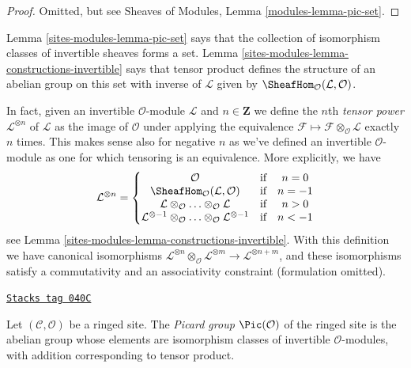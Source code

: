 \begin{proof}
Omitted, but see Sheaves of Modules, Lemma \ref{modules-lemma-pic-set}.
\end{proof}

Lemma \ref{sites-modules-lemma-pic-set} says that the collection of
isomorphism classes of invertible sheaves forms a set.
Lemma \ref{sites-modules-lemma-constructions-invertible} says that
tensor product defines the structure of an abelian group
on this set with inverse of $\mathcal{L}$ given by
$\SheafHom_\mathcal{O}(\mathcal{L}, \mathcal{O})$.

\medskip\noindent
In fact, given an invertible $\mathcal{O}$-module
$\mathcal{L}$ and $n \in \mathbf{Z}$ we define the
$n$th {\it tensor power} $\mathcal{L}^{\otimes n}$ of $\mathcal{L}$
as the image of $\mathcal{O}$ under applying the equivalence
$\mathcal{F} \mapsto \mathcal{F} \otimes_\mathcal{O} \mathcal{L}$
exactly $n$ times. This makes sense also for negative $n$ as
we've defined an invertible
$\mathcal{O}$-module as one for which tensoring is an equivalence.
More explicitly, we have
$$
\mathcal{L}^{\otimes n} =
\left\{
\begin{matrix}
\mathcal{O} & \text{if} & n = 0 \\
\SheafHom_\mathcal{O}(\mathcal{L}, \mathcal{O}) & \text{if} & n = -1\\
\mathcal{L} \otimes_\mathcal{O} \ldots \otimes_\mathcal{O} \mathcal{L}
& \text{if} & n > 0 \\
\mathcal{L}^{\otimes -1} \otimes_\mathcal{O} \ldots
\otimes_\mathcal{O} \mathcal{L}^{\otimes -1}
& \text{if} & n < -1
\end{matrix}
\right.
$$
see Lemma \ref{sites-modules-lemma-constructions-invertible}.
With this definition we have canonical isomorphisms
$\mathcal{L}^{\otimes n} \otimes_\mathcal{O}
\mathcal{L}^{\otimes m} \to
\mathcal{L}^{\otimes n + m}$, and these isomorphisms
satisfy a commutativity and an associativity constraint
(formulation omitted).

\begin{definition}[Pic]
\label{sites-modules-definition-pic}
\href{https://stacks.math.columbia.edu/tag/040C}{\texttt{Stacks tag 040C}}

Let $(\mathcal{C}, \mathcal{O})$ be a ringed site.
The {\it Picard group} $\Pic(\mathcal{O})$ of
the ringed site is the
abelian group whose elements are isomorphism classes of
invertible $\mathcal{O}$-modules, with addition
corresponding to tensor product.
\end{definition}

